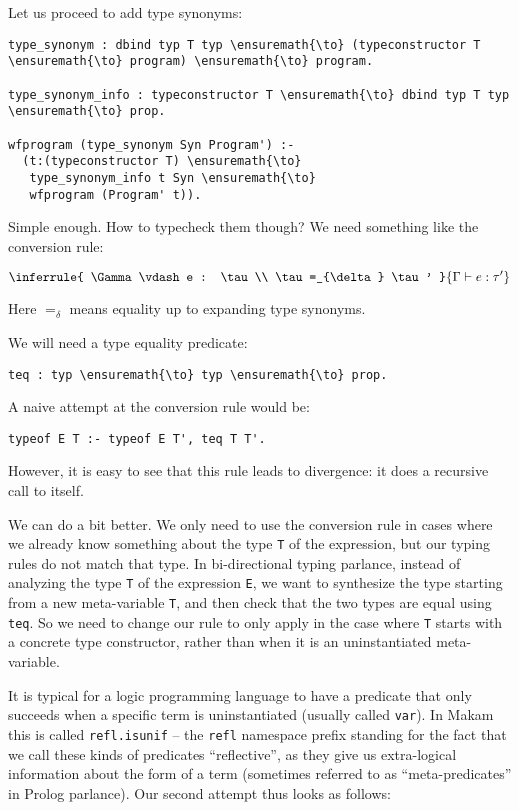 Let us proceed to add type synonyms:

\begin{verbatim}
type_synonym : dbind typ T typ \ensuremath{\to} (typeconstructor T \ensuremath{\to} program) \ensuremath{\to} program.

type_synonym_info : typeconstructor T \ensuremath{\to} dbind typ T typ \ensuremath{\to} prop.

wfprogram (type_synonym Syn Program') :-
  (t:(typeconstructor T) \ensuremath{\to}
   type_synonym_info t Syn \ensuremath{\to}
   wfprogram (Program' t)).
\end{verbatim}

Simple enough. How to typecheck them though? We need something like the
conversion rule:

\begin{displaymath}
\inferrule{
  \Gamma \vdash e : \tau \\ \tau =_{\delta} \tau'
}{
  \Gamma \vdash e : \tau'
}
\end{displaymath}

Here \(=_{\delta}\) means equality up to expanding type synonyms.

We will need a type equality predicate:

\begin{verbatim}
teq : typ \ensuremath{\to} typ \ensuremath{\to} prop.
\end{verbatim}

A naive attempt at the conversion rule would be:

\begin{verbatim}
typeof E T :- typeof E T', teq T T'.
\end{verbatim}

However, it is easy to see that this rule leads to divergence: it does a
recursive call to itself.

We can do a bit better. We only need to use the conversion rule in cases
where we already know something about the type \texttt{T} of the
expression, but our typing rules do not match that type. In
bi-directional typing parlance, instead of analyzing the type \texttt{T}
of the expression \texttt{E}, we want to synthesize the type starting
from a new meta-variable \texttt{T\textquotesingle{}}, and then check
that the two types are equal using \texttt{teq}. So we need to change
our rule to only apply in the case where \texttt{T} starts with a
concrete type constructor, rather than when it is an uninstantiated
meta-variable.

It is typical for a logic programming language to have a predicate that
only succeeds when a specific term is uninstantiated (usually called
\texttt{var}). In Makam this is called \texttt{refl.isunif} -- the
\texttt{refl} namespace prefix standing for the fact that we call these
kinds of predicates ``reflective'', as they give us extra-logical
information about the form of a term (sometimes referred to as
``meta-predicates'' in Prolog parlance). Our second attempt thus looks
as follows:

